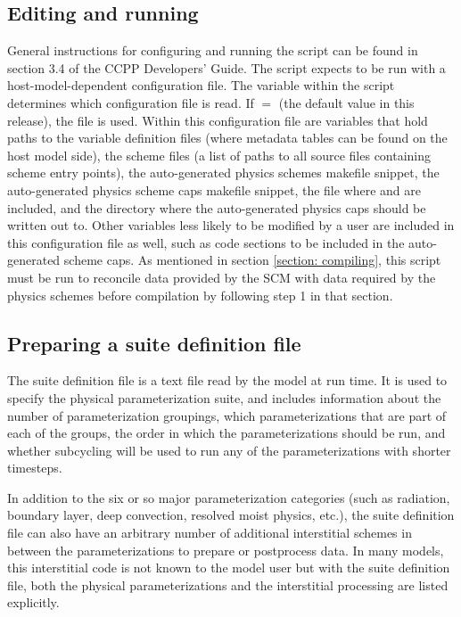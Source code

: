 \subsection{Editing and running }

General instructions for configuring and running the  script can be found in section 3.4 of the CCPP Developers' Guide. The script expects to be run with a host-model-dependent configuration file. The  variable within the script determines which configuration file is read. If  $=$  (the default value in this release), the file  is used. Within this configuration file are variables that hold paths to the variable definition files (where metadata tables can be found on the host model side), the scheme files (a list of paths to all source files containing scheme entry points), the auto-generated physics schemes makefile snippet, the auto-generated physics scheme caps makefile snippet, the file where  and  are included, and the directory where the auto-generated physics caps should be written out to. Other variables less likely to be modified by a user are included in this configuration file as well, such as code sections to be included in the auto-generated scheme caps. As mentioned in section \ref{section: compiling}, this script must be run to reconcile data provided by the SCM with data required by the physics schemes before compilation by following step 1 in that section.

\subsection{Preparing a suite definition file}
The suite definition file is a text file read by the model at run time. It is used to specify the physical parameterization suite, and includes information about the number of parameterization groupings, which parameterizations that are part of each of the groups, the order in which the parameterizations should be run, and whether subcycling will be used to run any of the parameterizations with shorter timesteps.

In addition to the six or so major parameterization categories (such as radiation, boundary layer, deep convection, resolved moist physics, etc.), the suite definition file can also have an arbitrary number of additional interstitial schemes in between the parameterizations to prepare or postprocess data. In many models, this interstitial code is not known to the model user but with the suite definition file, both the physical parameterizations and the interstitial processing are listed explicitly. 

